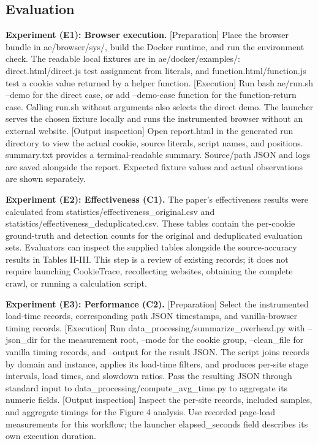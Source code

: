 \documentclass[conference]{IEEEtran}
\begin{document}
\subsection{Evaluation}
\noindent\textbf{Experiment (E1): Browser execution.} [Preparation] Place the browser bundle in ae/browser/sys/, build the Docker runtime, and run the environment check. The readable local fixtures are in ae/docker/examples/: direct.html/direct.js test assignment from literals, and function.html/function.js test a cookie value returned by a helper function. [Execution] Run bash ae/run.sh --demo for the direct case, or add --demo-case function for the function-return case. Calling run.sh without arguments also selects the direct demo. The launcher serves the chosen fixture locally and runs the instrumented browser without an external website. [Output inspection] Open report.html in the generated run directory to view the actual cookie, source literals, script names, and positions. summary.txt provides a terminal-readable summary. Source/path JSON and logs are saved alongside the report. Expected fixture values and actual observations are shown separately.

\noindent\textbf{Experiment (E2): Effectiveness (C1).} The paper's effectiveness results were calculated from statistics/effectiveness\_original.csv and statistics/effectiveness\_deduplicated.csv. These tables contain the per-cookie ground-truth and detection counts for the original and deduplicated evaluation sets. Evaluators can inspect the supplied tables alongside the source-accuracy results in Tables II-III. This step is a review of existing records; it does not require launching CookieTrace, recollecting websites, obtaining the complete crawl, or running a calculation script.

\noindent\textbf{Experiment (E3): Performance (C2).} [Preparation] Select the instrumented load-time records, corresponding path JSON timestamps, and vanilla-browser timing records. [Execution] Run data\_processing/summarize\_overhead.py with --json\_dir for the measurement root, --mode for the cookie group, --clean\_file for vanilla timing records, and --output for the result JSON. The script joins records by domain and instance, applies its load-time filters, and produces per-site stage intervals, load times, and slowdown ratios. Pass the resulting JSON through standard input to data\_processing/compute\_avg\_time.py to aggregate its numeric fields. [Output inspection] Inspect the per-site records, included samples, and aggregate timings for the Figure 4 analysis. Use recorded page-load measurements for this workflow; the launcher elapsed\_seconds field describes its own execution duration.
\end{document}
